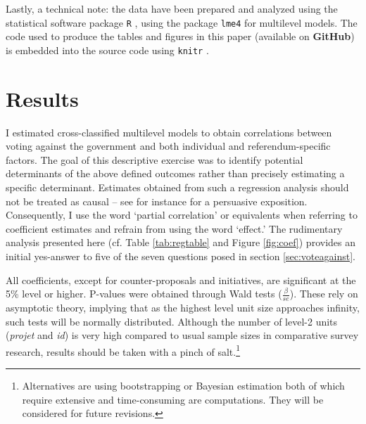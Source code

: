 \documentclass[11pt,a4paper]{article}\usepackage[]{graphicx}\usepackage[]{color}
\begin{document}
    
    
    Lastly, a technical note: the data have been prepared and analyzed using the statistical software package \texttt{R} \citep{r_core_team_r:_2014}, using the package \texttt{lme4} \citep{bates_lme4:_2014} for multilevel models. The code used to produce the tables and figures in this paper (available on \textbf{GitHub}) is embedded into the source code using \texttt{knitr} \citep{xie_knitr:_2014}.
    
    \section{Results}\label{sec:results}
    I estimated cross-classified multilevel models to obtain correlations between voting against the government and both individual and referendum-specific factors. The goal of this descriptive exercise was to identify potential determinants of the above defined outcomes rather than precisely estimating a specific determinant. Estimates obtained from such a regression analysis should not be treated as causal -- see for instance \citet{keele_perils_2014} for a persuasive exposition. Consequently, I use the word `partial correlation' or equivalents when referring to coefficient estimates and refrain from using the word `effect.' The rudimentary analysis presented here (cf. Table \ref{tab:regtable} and Figure \ref{fig:coef}) provides an initial yes-answer to five of the seven questions posed in section \ref{sec:voteagainst}.
    
    All coefficients, except for counter-proposals and initiatives, are significant at the 5\% level or higher. P-values were obtained through Wald tests ($\frac{\beta}{se}$). These rely on asymptotic theory, implying that as the highest level unit size approaches infinity, such tests will be normally distributed. Although the number of level-2 units (\textit{projet} and \textit{id}) is very high compared to usual sample sizes in comparative survey research, results should be taken with a pinch of salt.\footnote{Alternatives are using bootstrapping or Bayesian estimation both of which require extensive and time-consuming are computations. They will be considered for future revisions.} %
    
\end{document}
